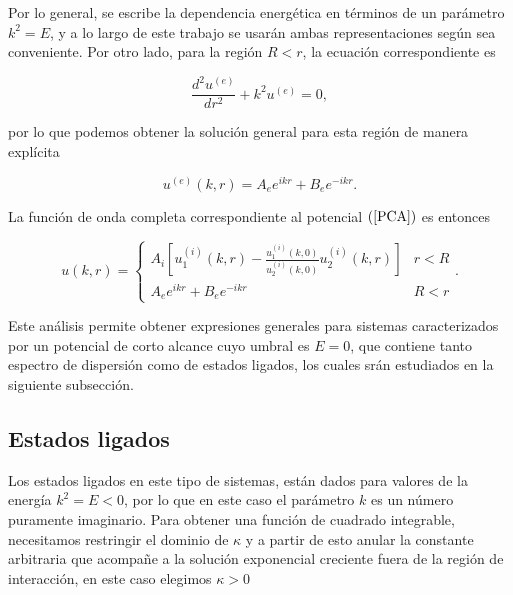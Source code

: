 Por lo general, se escribe la dependencia energética en términos de un parámetro $k^2 = E$, y a lo largo de este trabajo se usarán ambas representaciones según sea conveniente. Por otro lado, para la región $R < r$, la ecuación correspondiente es

\begin{equation*}
\frac{d^2 u^{(e)}}{dr^2} +  k^2 u^{(e)} = 0,
\end{equation*} 

por lo que podemos obtener la solución general para esta región de manera explícita

\begin{equation*}
u^{(e)}(k,r) = A_e e^{i k r} + B_e e^{- i k r}.
\end{equation*} 

La función de onda completa correspondiente al potencial $(\ref{PCA})$ es entonces 

\begin{equation}
\label{FOGCSI}
u(k,r) =
\begin{cases}
A_i \left[ u^{(i)}_1(k,r) -  \frac{u^{(i)}_1(k,0)}{u_2^{(i)}(k,0)} u_2^{(i)}(k,r) \right] & r < R 
\\ 
A_e e^{i k r} + B_e e^{-i k r} & R < r
\end{cases}.
\end{equation} 

Este análisis permite obtener expresiones generales para sistemas caracterizados por un potencial de corto alcance cuyo umbral es $E = 0$, que contiene tanto espectro de dispersión como de estados ligados, los cuales srán estudiados en la siguiente subsección.

\subsection{Estados ligados}\label{SSELPCA}

Los estados ligados en este tipo de sistemas, están dados para valores de la energía $k^2 = E <0$, por lo que en este caso el parámetro $k$ es un número puramente imaginario. Para obtener una función de cuadrado integrable, necesitamos restringir el dominio de $\kappa$ y a partir de esto anular la constante arbitraria que acompañe a la solución exponencial creciente fuera de la región de interacción, en este caso elegimos $\kappa > 0$

